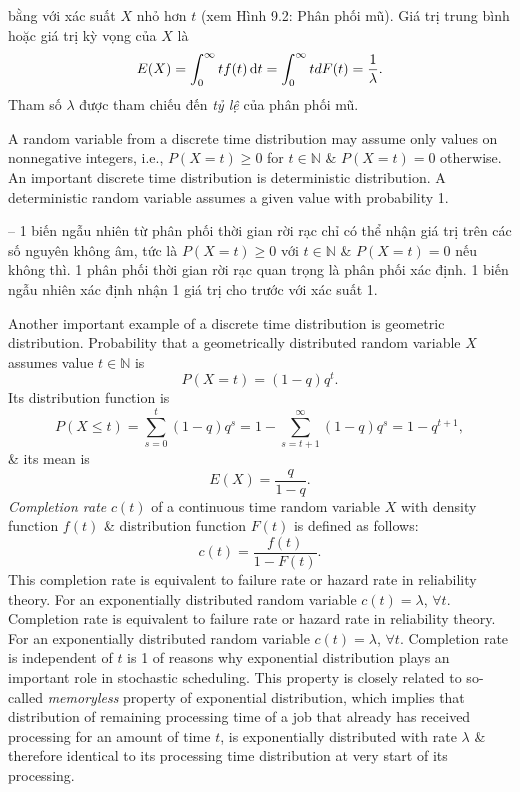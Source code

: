 \documentclass{article}
\begin{document}
\begin{itemize}
\begin{itemize}
        bằng với xác suất $X$ nhỏ hơn $t$ (xem {\sf Hình 9.2: Phân phối mũ}). Giá trị trung bình hoặc giá trị kỳ vọng của $X$ là
        \begin{equation*}
            E(X) = \int_0^\infty tf(t)\,{\rm d}t = \int_0^\infty tdF(t) = \frac{1}{\lambda}.
        \end{equation*}
        Tham số $\lambda$ được tham chiếu đến {\it tỷ lệ} của phân phối mũ.

        A random variable from a discrete time distribution may assume only values on nonnegative integers, i.e., $P(X = t)\ge0$ for $t\in\mathbb{N}$ \& $P(X = t) = 0$ otherwise. An important discrete time distribution is deterministic distribution. A deterministic random variable assumes a given value with probability 1.

        -- 1 biến ngẫu nhiên từ phân phối thời gian rời rạc chỉ có thể nhận giá trị trên các số nguyên không âm, tức là $P(X = t)\ge0$ với $t\in\mathbb{N}$ \& $P(X = t) = 0$ nếu không thì. 1 phân phối thời gian rời rạc quan trọng là phân phối xác định. 1 biến ngẫu nhiên xác định nhận 1 giá trị cho trước với xác suất 1.

        Another important example of a discrete time distribution is geometric distribution. Probability that a geometrically distributed random variable $X$ assumes value $t\in\mathbb{N}$ is
        \begin{equation*}
            P(X = t) = (1 - q)q^t.
        \end{equation*}
        Its distribution function is
        \begin{equation*}
            P(X\le t) = \sum_{s=0}^t (1 - q)q^s = 1 - \sum_{s=t+1}^\infty (1 - q)q^s = 1 - q^{t+1},
        \end{equation*}
        \& its mean is
        \begin{equation*}
            E(X) = \frac{q}{1 - q}.
        \end{equation*}
        {\it Completion rate} $c(t)$ of a continuous time random variable $X$ with density function $f(t)$ \& distribution function $F(t)$ is defined as follows:
        \begin{equation*}
            c(t) = \frac{f(t)}{1 - F(t)}.
        \end{equation*}
        This completion rate is equivalent to failure rate or hazard rate in reliability theory. For an exponentially distributed random variable $c(t) = \lambda$, $\forall t$. Completion rate is equivalent to failure rate or hazard rate in reliability theory. For an exponentially distributed random variable $c(t) = \lambda$, $\forall t$. Completion rate is independent of $t$ is 1 of reasons why exponential distribution plays an important role in stochastic scheduling. This property is closely related to so-called {\it memoryless} property of exponential distribution, which implies that distribution of remaining processing time of a job that already has received processing for an amount of time $t$, is exponentially distributed with rate $\lambda$ \& therefore identical to its processing time distribution at very start of its processing.


\end{itemize}
\end{itemize}
\end{document}
